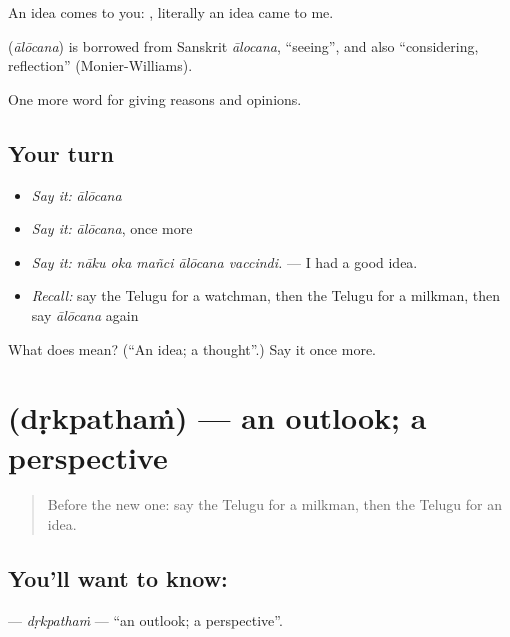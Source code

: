 An idea comes to you:   , literally an idea came to me.

\begin{cousinweb}
\textbf{} (\emph{ālōcana}) is borrowed from Sanskrit \emph{ālocana}, \textquotedblleft{}seeing\textquotedblright{}, and also \textquotedblleft{}considering, reflection\textquotedblright{} (Monier-Williams).
\end{cousinweb}

\begin{grammarlens}[title={What you've built}]
One more word for giving reasons and opinions.
\end{grammarlens}

\subsection*{Your turn}
\begin{itemize}
\raggedright
  \item \emph{Say it:} \emph{ālōcana}
  \item \emph{Say it:} \emph{ālōcana}, once more
  \item \emph{Say it:} \emph{nāku oka mañci ālōcana vaccindi.} — I had a good idea.
  \item \emph{Recall:} say the Telugu for a watchman, then the Telugu for a milkman, then say \emph{ālōcana} again
\end{itemize}

\begin{tcolorbox}[breakable,colback=teal!4,colframe=teal!35!black,title={Before you move on}]
What does  mean? (\textquotedblleft{}An idea; a thought\textquotedblright{}.) Say it once more.
\end{tcolorbox}
\section[\texorpdfstring{\te{దృక్పథం} (dṛkpathaṁ)}{దృక్పథం (dṛkpathaṁ)}]{ (dṛkpathaṁ) — an outlook; a perspective}

\label{lesson:TE-C382-drkpatham}



\begin{quote}
Before the new one: say the Telugu for a milkman, then the Telugu for an idea.
\end{quote}

\subsection*{You'll want to know: }
\textbf{} — \emph{dṛkpathaṁ} — \textquotedblleft{}an outlook; a perspective\textquotedblright{}.

